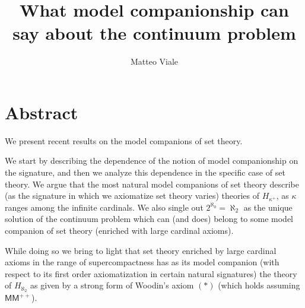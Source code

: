 \documentclass[11pt]{amsart}
\title{What model companionship can say about the continuum problem}
\author{Matteo Viale}
\begin{document}
\maketitle

\section*{Abstract}
We present recent results on the model companions of set theory. 

We start by describing the dependence of the notion of model companionship on the signature, and then we analyze this dependence in the specific case of set theory.  We argue that the most natural model companions of set theory describe (as the signature in which we axiomatize set theory varies) theories of $H_{\kappa^+}$, as $\kappa$ ranges among the infinite cardinals. We also single out $2^{\aleph_0}=\aleph_2$ as the unique solution of the continuum problem which can (and does) belong to some model companion of set theory (enriched with large cardinal axioms). 

While doing so we bring to light that set theory enriched by large cardinal axioms in the range of supercompactness has as its model companion (with respect to its first order axiomatization in certain natural signatures) the theory of $H_{\aleph_2}$ as given by a strong form of Woodin's axiom $(*)$ (which holds assuming $\mathsf{MM}^{++}$).
\end{document}
